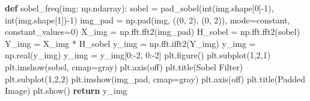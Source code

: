 \documentclass[
]{article}
\newenvironment{Shaded}{}{}
\newcommand{\BuiltInTok}[1]{\textcolor[rgb]{0.00,0.50,0.00}{#1}}
\newcommand{\ControlFlowTok}[1]{\textcolor[rgb]{0.00,0.44,0.13}{\textbf{#1}}}
\newcommand{\DecValTok}[1]{\textcolor[rgb]{0.25,0.63,0.44}{#1}}
\newcommand{\KeywordTok}[1]{\textcolor[rgb]{0.00,0.44,0.13}{\textbf{#1}}}
\newcommand{\NormalTok}[1]{#1}
\newcommand{\OperatorTok}[1]{\textcolor[rgb]{0.40,0.40,0.40}{#1}}
\newcommand{\StringTok}[1]{\textcolor[rgb]{0.25,0.44,0.63}{#1}}
\begin{document}
\begin{Shaded}
\begin{Highlighting}[]
\KeywordTok{def}\NormalTok{ sobel\_freq(img: np.ndarray):}
\NormalTok{    sobel }\OperatorTok{=}\NormalTok{ pad\_sobel(}\BuiltInTok{int}\NormalTok{(img.shape[}\DecValTok{0}\NormalTok{]}\OperatorTok{{-}}\DecValTok{1}\NormalTok{), }\BuiltInTok{int}\NormalTok{(img.shape[}\DecValTok{1}\NormalTok{])}\OperatorTok{{-}}\DecValTok{1}\NormalTok{)}
\NormalTok{    img\_pad }\OperatorTok{=}\NormalTok{ np.pad(img, ((}\DecValTok{0}\NormalTok{, }\DecValTok{2}\NormalTok{), (}\DecValTok{0}\NormalTok{, }\DecValTok{2}\NormalTok{)), mode}\OperatorTok{=}\StringTok{\textquotesingle{}constant\textquotesingle{}}\NormalTok{, constant\_values}\OperatorTok{=}\DecValTok{0}\NormalTok{)}
\NormalTok{    X\_img }\OperatorTok{=}\NormalTok{ np.fft.fft2(img\_pad)}
\NormalTok{    H\_sobel }\OperatorTok{=}\NormalTok{ np.fft.fft2(sobel)}
\NormalTok{    Y\_img }\OperatorTok{=}\NormalTok{ X\_img }\OperatorTok{*}\NormalTok{ H\_sobel}
\NormalTok{    y\_img }\OperatorTok{=}\NormalTok{ np.fft.ifft2(Y\_img)}
\NormalTok{    y\_img }\OperatorTok{=}\NormalTok{ np.real(y\_img)}
\NormalTok{    y\_img }\OperatorTok{=}\NormalTok{ y\_img[}\DecValTok{0}\NormalTok{:}\OperatorTok{{-}}\DecValTok{2}\NormalTok{, }\DecValTok{0}\NormalTok{:}\OperatorTok{{-}}\DecValTok{2}\NormalTok{]}
\NormalTok{    plt.figure()}
\NormalTok{    plt.subplot(}\DecValTok{1}\NormalTok{,}\DecValTok{2}\NormalTok{,}\DecValTok{1}\NormalTok{)}
\NormalTok{    plt.imshow(sobel, cmap}\OperatorTok{=}\StringTok{\textquotesingle{}gray\textquotesingle{}}\NormalTok{)}
\NormalTok{    plt.axis(}\StringTok{\textquotesingle{}off\textquotesingle{}}\NormalTok{)}
\NormalTok{    plt.title(}\StringTok{\textquotesingle{}Sobel Filter\textquotesingle{}}\NormalTok{)}
\NormalTok{    plt.subplot(}\DecValTok{1}\NormalTok{,}\DecValTok{2}\NormalTok{,}\DecValTok{2}\NormalTok{)}
\NormalTok{    plt.imshow(img\_pad, cmap}\OperatorTok{=}\StringTok{\textquotesingle{}gray\textquotesingle{}}\NormalTok{)}
\NormalTok{    plt.axis(}\StringTok{\textquotesingle{}off\textquotesingle{}}\NormalTok{)}
\NormalTok{    plt.title(}\StringTok{\textquotesingle{}Padded Image\textquotesingle{}}\NormalTok{)}
\NormalTok{    plt.show()}
    \ControlFlowTok{return}\NormalTok{ y\_img}


\end{Highlighting}
\end{Shaded}
\end{document}
